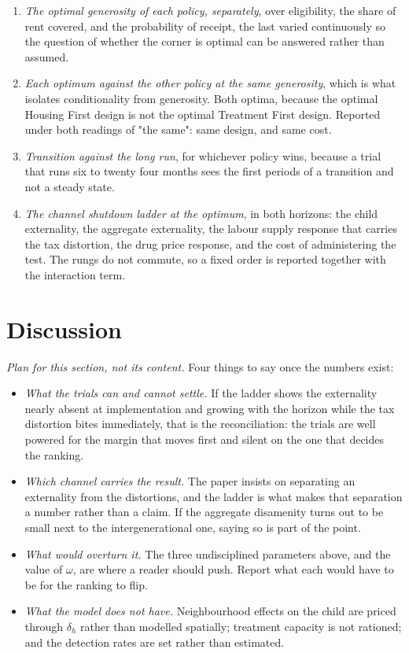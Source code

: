 \documentclass[10pt]{article}
\begin{document}
\begin{enumerate}\setlength{\itemsep}{0.25em}
\item \emph{The optimal generosity of each policy, separately}, over
eligibility, the share of rent covered, and the probability of receipt, the last
varied continuously so the question of whether the corner is optimal can be answered
rather than assumed.
\item \emph{Each optimum against the other policy at the same
generosity}, which is what isolates conditionality from generosity. Both optima,
because the optimal Housing First design is not the optimal Treatment First design.
Reported under both readings of "the same": same design, and same cost.
\item \emph{Transition against the long run}, for whichever policy
wins, because a trial that runs six to twenty four months sees the first periods of a
transition and not a steady state.
\item \emph{The channel shutdown ladder at the optimum}, in both
horizons: the child externality, the aggregate externality, the labour supply
response that carries the tax distortion, the drug price response, and the cost of
administering the test. The rungs do not commute, so a fixed order is reported
together with the interaction term.
\end{enumerate}

\section{Discussion}\label{sec:discussion}

\emph{Plan for this section, not its content.} Four things to say once
the numbers exist:

\begin{itemize}\setlength{\itemsep}{0.25em}
\item \emph{What the trials can and cannot settle.} If the ladder
shows the externality nearly absent at implementation and growing with the horizon
while the tax distortion bites immediately, that is the reconciliation: the trials
are well powered for the margin that moves first and silent on the one that decides
the ranking.
\item \emph{Which channel carries the result.} The paper insists on
separating an externality from the distortions, and the ladder is what makes that
separation a number rather than a claim. If the aggregate disamenity turns out to be
small next to the intergenerational one, saying so is part of the point.
\item \emph{What would overturn it.} The three undisciplined
parameters above, and the value of $\omega$, are where a reader should push. Report
what each would have to be for the ranking to flip.
\item \emph{What the model does not have.} Neighbourhood effects on
the child are priced through $\delta_h$ rather than modelled spatially; treatment
capacity is not rationed; and the detection rates are set rather than estimated.
\end{itemize}
\end{document}
